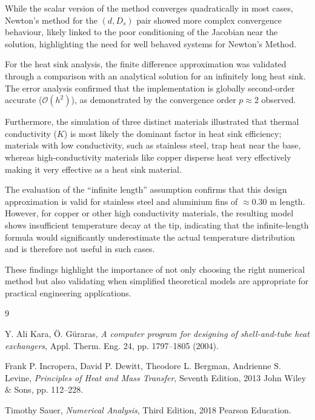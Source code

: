\documentclass[11pt, a4paper]{article}
\theoremstyle{definition}
\begin{document}
While the scalar version of the method converges quadratically in most cases, Newton's method for the $(d, D_s)$ pair showed more complex convergence behaviour, likely linked to the poor conditioning of the Jacobian near the solution, highlighting the need for well behaved systems for Newton's Method.


For the heat sink analysis, the finite difference approximation was validated through a comparison with an analytical solution for an infinitely long heat sink.
The error analysis confirmed that the implementation is globally second-order accurate ($\mathcal{O}(h^2)$), as demonstrated by the convergence order $p \approx 2$ observed.


Furthermore, the simulation of three distinct materials illustrated that thermal conductivity ($K$) is most likely the dominant factor in heat sink efficiency; materials with low conductivity, such as stainless steel, trap heat near the base, whereas high-conductivity materials like copper disperse heat very effectively making it very effective as a heat sink material.


The evaluation of the “infinite length” assumption confirms that this design approximation is valid for stainless steel and aluminium fins of $\approx 0.30$ m length. However, for copper or other high conductivity materials, the resulting model shows insufficient temperature decay at the tip, indicating that the  infinite-length formula would significantly underestimate the actual temperature distribution and is therefore not useful in such cases.


These findings highlight the importance of not only choosing the right numerical method but also validating when simplified theoretical models are appropriate for practical engineering applications.

\begin{thebibliography}{9}
	
	Y. Ali Kara, Ö. Güraras, \textit{A computer program for designing of shell-and-tube heat exchangers}, Appl. Therm. Eng. 24, pp. 1797–1805 (2004).
	
	Frank P. Incropera, David P. Dewitt, Theodore L. Bergman, Andrienne S. Levine, \textit{Principles of Heat and Mass Transfer}, Seventh Edition, 2013 John Wiley \& Sons, pp. 112–228.
	
	Timothy Sauer, \textit{Numerical Analysis}, Third Edition, 2018 Pearson Education.
	
\end{thebibliography}
\end{document}

